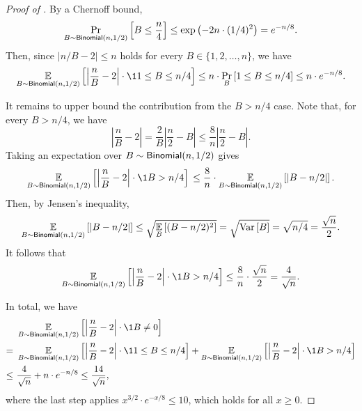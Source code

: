 \expectednoverb*

\begin{proof}[Proof of ]
    By a Chernoff bound,
    \[
        \Pr_{B \sim \mathsf{Binomial}\left(n, 1/2\right)}\left[B \le \frac{n}{4}\right]  \le \exp\left(-2n \cdot  (1/4)^2\right) = e^{-n/8}.
    \]
    Then, since $|n/B - 2| \le n$ holds for every $B \in \{1, 2, \ldots, n\}$, we have
    \[
        \Ex{B \sim \Binomial(n, 1/2)}{\left|\frac{n}{B} - 2\right| \cdot \1{1 \le B \le n/4}}
    \le n \cdot \pr{B}{1 \le B \le n/4}
    \le n\cdot e^{-n/8}.
    \]
    
    It remains to upper bound the contribution from the $B > n / 4$ case. Note that, for every $B > n/4$, we have
    \[
        \left|\frac{n}{B} - 2\right|
    =   \frac{2}{B}\left|\frac{n}{2} - B\right|
    \le \frac{8}{n}\left|\frac{n}{2} - B\right|.
    \]
    Taking an expectation over $B \sim \mathsf{Binomial}(n, 1/2)$ gives
    \[
        \Ex{B \sim \Binomial(n, 1/2)}{\left|\frac{n}{B} - 2\right| \cdot \1{B > n/4}}\\
    \le \frac{8}{n}\cdot\Ex{B \sim \Binomial(n, 1/2)}{|B - n/2|}.
    \]
    Then, by Jensen's inequality,
    \[
        \operatorname*{\mathbb{E}}_{B \sim \mathsf{Binomial}(n, 1/2)}\left[|B - n/2|\right]
    \le \sqrt{\operatorname*{\mathbb{E}}_{B}\left[(B - n/2)^2\right]}
    =   \sqrt{\operatorname*{\mathrm{Var}}_{}\left[B\right]}
    =   \sqrt{n/4} = \frac{\sqrt{n}}{2}.
    \]
    It follows that
    \[
        \Ex{B \sim \Binomial(n, 1/2)}{\left|\frac{n}{B} - 2\right| \cdot \1{B > n/4}}
    \le \frac{8}{n}\cdot\frac{\sqrt{n}}{2} = \frac{4}{\sqrt{n}}.
    \]
    
    In total, we have
    \begin{align*}
        &~\Ex{B \sim \Binomial(n, 1/2)}{\left|\frac{n}{B} - 2\right|\cdot\1{B \ne 0}}\\
    =   &~\Ex{B \sim \Binomial(n, 1/2)}{\left|\frac{n}{B} - 2\right|\cdot\1{1 \le B \le n/4}} + \Ex{B \sim \Binomial(n, 1/2)}{\left|\frac{n}{B} - 2\right|\cdot\1{B > n/4}}\\
    \le &~\frac{4}{\sqrt{n}} + n\cdot e^{-n/8}
    \le \frac{14}{\sqrt{n}},
    \end{align*}
    where the last step applies $x^{3/2} \cdot e^{-x/8} \le 10$, which holds for all $x \ge 0$.
\end{proof}